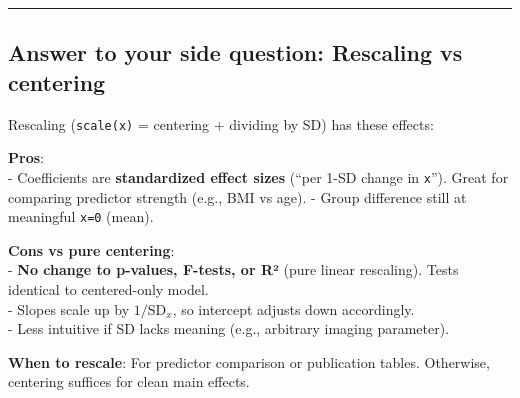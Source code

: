 \documentclass[
]{article}
\begin{document}
\begin{center}\rule{0.5\linewidth}{0.5pt}\end{center}

\subsection{Answer to your side question: Rescaling vs
centering}\label{answer-to-your-side-question-rescaling-vs-centering}

Rescaling (\texttt{scale(x)} = centering + dividing by SD) has these
effects:

\textbf{Pros}:\\
- Coefficients are \textbf{standardized effect sizes} (``per 1-SD change
in \texttt{x}''). Great for comparing predictor strength (e.g., BMI vs
age). - Group difference still at meaningful \texttt{x=0} (mean).

\textbf{Cons vs pure centering}:\\
- \textbf{No change to p-values, F-tests, or R²} (pure linear
rescaling). Tests identical to centered-only model.\\
- Slopes scale up by \(1/\text{SD}_x\), so intercept adjusts down
accordingly.\\
- Less intuitive if SD lacks meaning (e.g., arbitrary imaging
parameter).

\textbf{When to rescale}: For predictor comparison or publication
tables. Otherwise, centering suffices for clean main effects.
\end{document}
